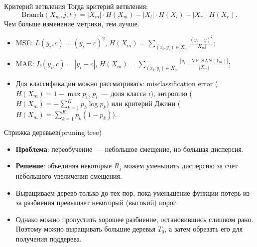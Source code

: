 \documentclass[notheorems, handout]{beamer}
\begin{document}
\begin{frame}{Критерий ветвления}
  Тогда критерий ветвления:
  \[
    \mathrm{Branch} (X _m, j, t) = |X _m| \cdot H(X _m) - |X _l|
    \cdot H(X _l) - |X _r| \cdot H(X _r).
  \]
  Чем больше изменение метрики, тем лучше.

  \begin{itemize}
    \item MSE: $L (y _i, c) = (y _i - c) ^2$, $H (X _m) = \sum
      \limits _{(x _i, y _i) \in X _m} \frac {(y _i - \overline{y})
      ^2} {|X _m|}$;
    \item MAE: $L (y _i, c) = |y _i - c|$, $H (X _m) = \sum \limits
      _{(x _i, y _i) \in X _m} \frac {|y _i - \mathrm{MEDIAN}(Y _m)|} {|X _m|}$;
    \item Для классификации можно рассматривать: misclassification
      error ($H (X _m) = 1 - \max p _i$, $p _i$~--- доля класса $i$),
      энтропию ($H (X _m) = - \sum ^K _{k = 1} p _k \log p_k$) или
      критерий Джини ($H (X _m) = \sum ^K _{k = 1} p _k (1 - p_k)$).
  \end{itemize}
\end{frame}

\begin{frame}{Стрижка деревьев(pruning tree)}
  \begin{itemize}
    \item \textbf{Проблема}: переобучение~--- небольшое смещение, но
      большая дисперсия.\medskip
    \item \textbf{Решение}: объединяя некоторые $R_{j}$ можем
      уменьшить дисперсию за счет небольшого увеличения смещения.\medskip
    \item Выращиваем дерево только до тех пор, пока уменьшение
      функции потерь из-за разбиения превышает некоторый (высокий)
      порог.\medskip
    \item Однако можно пропустить хорошее разбиение, остановившись
      слишком рано. Поэтому можно выращивать большие деревья $T_{0}$,
      а затем обрезать его для получения поддерева.\medskip
  \end{itemize}
\end{frame}
\end{document}
